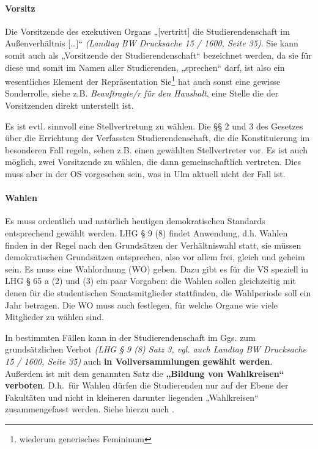\documentclass[
10pt,
a4paper,
twoside,								%
titlepage=false,							%
draft=false								%
]{scrartcl}
\begin{document}
\paragraph{Vorsitz}

Die Vorsitzende des exekutiven Organs „[vertritt] die Studierendenschaft im Außenverhältnis […]“ \textit{(Landtag BW Drucksache 15 / 1600, Seite 35)}. Sie kann somit auch als „Vorsitzende der Studierendenschaft“ bezeichnet werden, da sie für diese und somit im Namen aller Studierenden, „sprechen“ darf, ist also ein wesentliches Element der Repräsentation Sie\footnote{wiederum generisches Femininum} hat auch sonst eine gewisse Sonderrolle, siehe z.B. \emph{Beauftragte/r für den Haushalt}, eine Stelle die der Vorsitzenden direkt unterstellt ist.

Es ist evtl. sinnvoll eine Stellvertretung zu wählen. Die §§ 2 und 3 des Gesetzes über die Errichtung der Verfassten Studierendenschaft, die die Konstituierung im besonderen Fall regeln, sehen z.B. einen gewählten Stellvertreter vor. Es ist auch möglich, zwei Vorsitzende zu wählen, die dann gemeinschaftlich vertreten. Dies muss aber in der OS vorgesehen sein, was in Ulm aktuell nicht der Fall ist.



\paragraph{Wahlen}\label{Glossar: Wahlen}

Es muss ordentlich und natürlich heutigen demokratischen Standards entsprechend gewählt werden. LHG § 9 (8) findet Anwendung, d.h. Wahlen finden in der Regel nach den Grundsätzen der Verhältniswahl statt, sie müssen demokratischen Grundsätzen entsprechen, also vor allem frei, gleich und geheim sein. Es muss eine Wahlordnung (WO) geben. Dazu gibt es für die VS speziell in LHG § 65 a (2) und (3) ein paar Vorgaben: die Wahlen sollen gleichzeitig mit denen für die studentischen Senatsmitglieder stattfinden, die Wahlperiode soll ein Jahr betragen. Die WO muss auch festlegen, für welche Organe wie viele Mitglieder zu wählen sind.

In bestimmten Fällen kann in der Studierendenschaft im Ggs. zum grundsätzlichen Verbot \textit{(LHG § 9 (8) Satz 3, vgl. auch Landtag BW Drucksache 15 / 1600, Seite 35)} auch \textbf{in Vollversammlungen gewählt werden}. Außerdem ist mit dem genannten Satz die \textbf{„Bildung von Wahlkreisen“ verboten}. D.h.~für Wahlen dürfen die Studierenden nur auf der Ebene der Fakultäten und nicht in kleineren darunter liegenden „Wahlkreisen“ zusammengefasst werden. Siehe hierzu auch .
\end{document}
